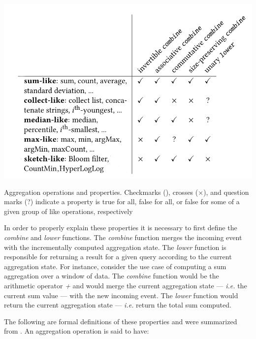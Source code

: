 \begin{table}[!htb]
    \begin{center}
      \includegraphics[scale=0.5]{figures/aggregation-operations-properties.png}
      \caption[Aggregation operations and properties]{Aggregation operations and properties. Checkmarks (\checkmark), crosses ($\times$), and question marks (?) indicate a property is true for all, false for all, or false for some of a given group of like operations, respectively}
      \label{tbl:aggregations-properties}
    \end{center}
\end{table}


In order to properly explain these properties it is necessary to first define the \textit{combine} and \textit{lower} functions. The \textit{combine} function merges the incoming event with the incrementally computed aggregation state. The \textit{lower} function is responsible for returning a result for a given query according to the current aggregation state. For instance, consider the use case of computing a sum aggregation over a window of data. The \textit{combine} function would be the arithmetic operator \textit{+} and would merge the current aggregation state --- \textit{i.e.} the current sum value --- with the new incoming event. The \textit{lower} function would return the current aggregation state --- \textit{i.e.} return the total sum computed.

The following are formal definitions of these properties and were summarized from \cite{Tangwongsan-Sliding-Window-Aggregation-Algorithms}. An aggregation operation is said to have:

